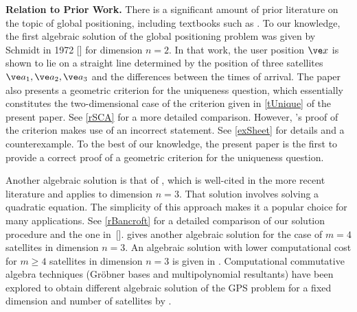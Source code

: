 \documentclass[reqno]{amsart}
\begin{document}
\par{\bf Relation to Prior Work.} There is a significant amount of prior literature on the topic of global positioning, including textbooks such as . To our knowledge, the first algebraic solution of the global positioning problem was given by Schmidt in 1972 [] for dimension $n=2$. In that work, the user position $\ve x$ is shown to lie on a straight line determined by the position of three satellites $\ve a_1,\ve a_2,\ve a_3$ and the differences between the times of arrival. The paper also presents a geometric criterion for the uniqueness question, which essentially constitutes the two-dimensional case of the criterion given in \cref{tUnique} of the present paper. See \cref{rSCA} for a more detailed comparison. However, 's proof of the criterion makes use of an incorrect statement. See \cref{exSheet} for details and a counterexample. To the best of our knowledge, the present paper is the first to provide a correct proof of a geometric criterion for the uniqueness question.

Another algebraic solution is that of , which is well-cited in the more recent literature and applies to dimension $n=3$. That solution involves solving a quadratic equation. %
The simplicity of this approach makes it a popular choice for many applications. See \cref{rBancroft} for a detailed comparison of our solution procedure and the one in~[].  gives another algebraic solution for the case of $m=4$ satellites in dimension $n=3$. 
An algebraic solution with lower computational cost for $m\geq 4$ satellites in dimension $n=3$ is given in . Computational commutative algebra techniques (Gr\"obner bases and multipolynomial resultants) have been explored to obtain different algebraic solution of the GPS problem for a fixed dimension and number of satellites by .
\end{document}
